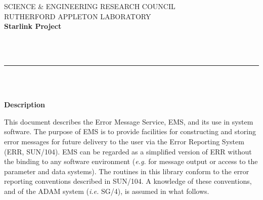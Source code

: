 \newcommand{\sstbugs}[1]{\item[Bugs:] #1}

\newcommand{\sstitemlist}[1]{
  \mbox{} \\
  \vspace{-3.5ex}
  \begin{itemize}
     #1
  \end{itemize}
}

\newcommand{\sstitem}{\item}





\thispagestyle{empty}
SCIENCE \& ENGINEERING RESEARCH COUNCIL \hfill \stardocname\\
RUTHERFORD APPLETON LABORATORY\\
{\large\bf Starlink Project\\}
{\large\bf \stardoccategory\ \stardocnumber}
\begin{flushright}
\stardocauthors\\
\stardocdate
\end{flushright}
\vspace{-4mm}
\rule{\textwidth}{0.5mm}
\vspace{5mm}
\begin{center}
{\Huge\bf  \stardoctitle \\ [2.5ex]}
{\LARGE\bf \stardocversion \\ [4ex]}
{\Huge\bf  \stardocmanual}
\end{center}
\vspace{20mm}

\begin{center}
{\Large\bf Description}
\end{center}

This document describes the Error Message Service, EMS, and its use in 
system software.
The purpose of EMS is to provide facilities for constructing and storing 
error messages for future delivery to the user via the Error Reporting
System (ERR, SUN/104).
EMS can be regarded as a simplified version of ERR without the binding to
any software environment ({\em e.g.} for message output or access to the
parameter and data systems).
The routines in this library conform to the error reporting conventions
described in SUN/104. 
A knowledge of these conventions, and of the ADAM system ({\em i.e.} SG/4), is 
assumed in what follows.

